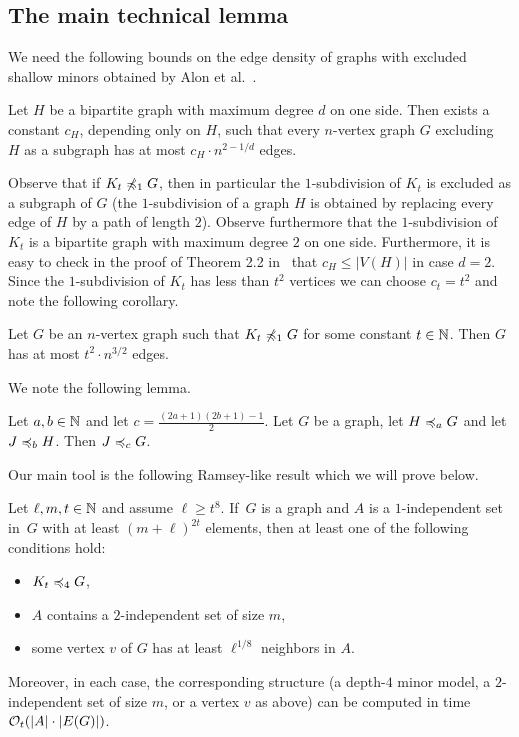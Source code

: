 \subsection{The main technical lemma}

We need the following bounds on the edge density
of graphs with excluded shallow minors obtained
by Alon et al.~\cite{alon2003turan}. 

\begin{lemma}\label{lem:densitynd}
Let $H$ be a bipartite graph with maximum degree
$d$ on one side. Then exists a constant $c_H$, depending 
only on $H$, such that every $n$-vertex graph $G$
excluding~$H$ as a subgraph has at most $c_H\cdot n^{2-1/d}$
edges. 
\end{lemma} 

Observe that if $K_t\not\preccurlyeq_1G$, then in particular
the $1$-subdivision of $K_t$ is excluded as a subgraph
of $G$ (the $1$-subdivision of a graph $H$ is obtained by 
replacing every edge of $H$ by a path of length $2$). 
Observe furthermore that the $1$-subdivision of 
$K_t$ is a bipartite graph with maximum degree $2$ on one
side. Furthermore, it is easy to check in the 
proof of Theorem 2.2 in~\cite{alon2003turan} 
that $c_H\leq |V(H)|$
in case $d=2$. Since the $1$-subdivision of $K_t$ has 
less than $t^2$ vertices we can choose $c_t=t^2$ and
note the following corollary.   

\begin{corollary}\label{crl:densitynd}
Let $G$ be an $n$-vertex graph such that $K_t\not\preccurlyeq_1 G$ for
some constant $t\in \mathbb{N}$. Then $G$ has at most 
$t^2\cdot n^{3/2}$ edges.
\end{corollary}

We note the following lemma. 

\begin{lemma}\label{lem:combineminors}
Let $a,b\in \mathbb{N}$ and let $c=\frac{(2a+1)(2b+1)-1}{2}$. 
Let $G$ be a graph, let $H\preccurlyeq_aG$ and let 
$J\preccurlyeq_bH$. Then $J\preccurlyeq_cG$. 
\end{lemma}

Our main tool is the following Ramsey-like result which we will
prove below. 

\begin{lemma}\label{lem:apex}
Let $\ell,m,t\in \mathbb{N}$ and assume $\ell\geq t^{8}$. 
If~$G$ is a graph and $A$ is a $1$-independent set in~$G$
with at least $(m+\ell)^{2t}$  elements,
then at least one of the following conditions hold:
\begin{itemize}
  \item $K_t\preccurlyeq_{4} G$,
\item  $A$ contains a $2$-independent set of size $m$, 
\item  some vertex $v$ of $G$
has at least $\ell^{1/8}$ neighbors in $A$.
\end{itemize}
Moreover, in each case, the corresponding structure (a depth-$4$ minor model, a $2$-independent set of size $m$, or a vertex $v$ as above) can be computed in time $\mathcal{O}_t(|A|\cdot |E(G)|)$. 
\end{lemma}

